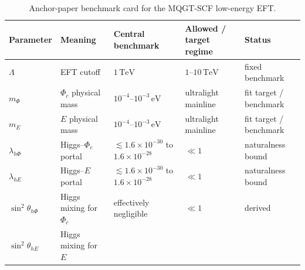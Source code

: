 \documentclass[aps,prd,twocolumn,superscriptaddress,nofootinbib]{revtex4-2}
\begin{document}
\begin{table}[t]
\centering
\footnotesize
\setlength{\tabcolsep}{3pt}
\renewcommand{\arraystretch}{1.12}
\caption{Anchor-paper benchmark card for the MQGT-SCF low-energy EFT.}
\label{tab:paramcard}
\begin{tabular}{@{}lllll@{}}
\toprule
\parbox[t]{0.12\textwidth}{\raggedright Parameter} &
\parbox[t]{0.20\textwidth}{\raggedright Meaning} &
\parbox[t]{0.17\textwidth}{\raggedright Central benchmark} &
\parbox[t]{0.23\textwidth}{\raggedright Allowed / target regime} &
\parbox[t]{0.16\textwidth}{\raggedright Status} \\
\midrule
$\Lambda$ &
\parbox[t]{0.20\textwidth}{\raggedright EFT cutoff} &
\parbox[t]{0.17\textwidth}{\raggedright $1\,\mathrm{TeV}$} &
\parbox[t]{0.23\textwidth}{\raggedright $1$--$10\,\mathrm{TeV}$} &
\parbox[t]{0.16\textwidth}{\raggedright fixed benchmark} \\
$m_{\Phi}$ &
\parbox[t]{0.20\textwidth}{\raggedright $\Phi_c$ physical mass} &
\parbox[t]{0.17\textwidth}{\raggedright $10^{-4}$--$10^{-3}\,\mathrm{eV}$} &
\parbox[t]{0.23\textwidth}{\raggedright ultralight mainline} &
\parbox[t]{0.16\textwidth}{\raggedright fit target / benchmark} \\
$m_E$ &
\parbox[t]{0.20\textwidth}{\raggedright $E$ physical mass} &
\parbox[t]{0.17\textwidth}{\raggedright $10^{-4}$--$10^{-3}\,\mathrm{eV}$} &
\parbox[t]{0.23\textwidth}{\raggedright ultralight mainline} &
\parbox[t]{0.16\textwidth}{\raggedright fit target / benchmark} \\
$\lambda_{h\Phi}$ &
\parbox[t]{0.20\textwidth}{\raggedright Higgs--$\Phi_c$ portal} &
\parbox[t]{0.17\textwidth}{\raggedright $\lesssim 1.6\times10^{-30}$ to $1.6\times10^{-28}$} &
\parbox[t]{0.23\textwidth}{\raggedright $\ll 1$} &
\parbox[t]{0.16\textwidth}{\raggedright naturalness bound} \\
$\lambda_{hE}$ &
\parbox[t]{0.20\textwidth}{\raggedright Higgs--$E$ portal} &
\parbox[t]{0.17\textwidth}{\raggedright $\lesssim 1.6\times10^{-30}$ to $1.6\times10^{-28}$} &
\parbox[t]{0.23\textwidth}{\raggedright $\ll 1$} &
\parbox[t]{0.16\textwidth}{\raggedright naturalness bound} \\
$\sin^2\theta_{h\Phi}$ &
\parbox[t]{0.20\textwidth}{\raggedright Higgs mixing for $\Phi_c$} &
\parbox[t]{0.17\textwidth}{\raggedright effectively negligible} &
\parbox[t]{0.23\textwidth}{\raggedright $\ll 1$} &
\parbox[t]{0.16\textwidth}{\raggedright derived} \\
$\sin^2\theta_{hE}$ &
\parbox[t]{0.20\textwidth}{\raggedright Higgs mixing for $E$} &

\end{tabular}
\end{table}
\end{document}
